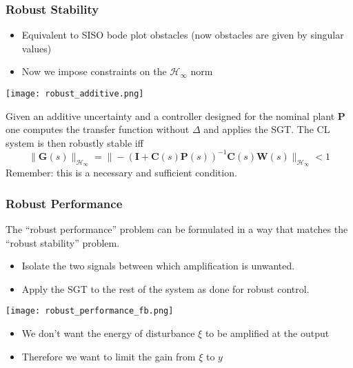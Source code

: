 \subsubsection{Robust Stability}
\begin{itemize}
    \item Equivalent to SISO bode plot obstacles (now obstacles are given by singular values)
    \item Now we impose constraints on the $\mathcal{H}_{\infty}$ norm
\end{itemize}

\begin{center}
    \texttt{[image: robust\_additive.png]}
\end{center}
Given an additive uncertainty and a controller designed for the nominal plant $\mathbf{P}$ one computes the transfer function without $\Delta$ and applies the SGT. The CL system is then robustly stable iff
\begin{equation*}
    \|\mathbf{G}(s)\|_{\mathcal{H}_\infty}=\|-{(\mathbf{I}+\mathbf{C}(s)\mathbf{P}(s))}^{-1}\mathbf{C}(s)\mathbf{W}(s)\|_{\mathcal{H}_\infty}<1
\end{equation*}
Remember: this is a necessary and sufficient condition.


\subsubsection{Robust Performance}
The “robust performance” problem can be formulated in a way that matches the “robust stability” problem.
\begin{itemize}
    \item Isolate the two signals between which amplification is unwanted.
    \item Apply the SGT to the rest of the system as done for robust control.
\end{itemize}


\begin{center}
    \texttt{[image: robust\_performance\_fb.png]}
\end{center}
\begin{itemize}
    \item We don't want the energy of disturbance $\xi$ to be amplified at the output
    \item Therefore we want to limit the gain from $\xi$ to $y$
\end{itemize}

